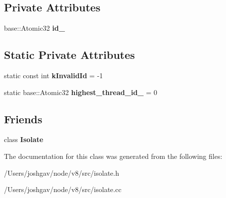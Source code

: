 \subsection*{Private Attributes}
\begin{DoxyCompactItemize}
\item 
base\+::\+Atomic32 {\bfseries id\+\_\+}\hypertarget{classv8_1_1internal_1_1_thread_id_a475e9bf6ded0944d4af0c3ed083d2eaa}{}\label{classv8_1_1internal_1_1_thread_id_a475e9bf6ded0944d4af0c3ed083d2eaa}

\end{DoxyCompactItemize}
\subsection*{Static Private Attributes}
\begin{DoxyCompactItemize}
\item 
static const int {\bfseries k\+Invalid\+Id} = -\/1\hypertarget{classv8_1_1internal_1_1_thread_id_a5a29a6012fa809eaa76a51d8ee7b4228}{}\label{classv8_1_1internal_1_1_thread_id_a5a29a6012fa809eaa76a51d8ee7b4228}

\item 
static base\+::\+Atomic32 {\bfseries highest\+\_\+thread\+\_\+id\+\_\+} = 0\hypertarget{classv8_1_1internal_1_1_thread_id_afcd32a579682d32003a1a009c0c65917}{}\label{classv8_1_1internal_1_1_thread_id_afcd32a579682d32003a1a009c0c65917}

\end{DoxyCompactItemize}
\subsection*{Friends}
\begin{DoxyCompactItemize}
\item 
class {\bfseries Isolate}\hypertarget{classv8_1_1internal_1_1_thread_id_aba4f0964bdacf2bbf62cf876e5d28d0a}{}\label{classv8_1_1internal_1_1_thread_id_aba4f0964bdacf2bbf62cf876e5d28d0a}

\end{DoxyCompactItemize}


The documentation for this class was generated from the following files\+:\begin{DoxyCompactItemize}
\item 
/\+Users/joshgav/node/v8/src/isolate.\+h\item 
/\+Users/joshgav/node/v8/src/isolate.\+cc\end{DoxyCompactItemize}
